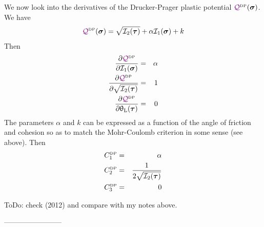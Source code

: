 \vspace{.5cm}

We now look into the derivatives of the Drucker-Prager plastic potential ${\color{violet}\cal Q}^{\text{\tiny DP}}(\bm\sigma)$.
We have
\[
{\color{violet}\cal Q}^{\text{\tiny DP}} (\bm\sigma)= \sqrt{{\cal I}_2({\bm \tau})} + \alpha {\cal I}_1({\bm \sigma}) + k 
\]
Then
\begin{eqnarray}
\frac{\partial {\color{violet}\cal Q}^{\text{\tiny DP}} }{\partial {\cal I}_1(\bm\sigma)} &=& \alpha \\
\frac{\partial {\color{violet}\cal Q}^{\text{\tiny DP}} }{\partial \sqrt{{\cal I}_2(\bm\tau)}}&=& 1  \\
\frac{\partial {\color{violet}\cal Q}^{\text{\tiny DP}} }{\partial \uptheta_{\rm L}(\bm\tau)} &=& 0 
\end{eqnarray}
The parameters $\alpha$ and $k$ can be expressed as a function of the angle of friction 
and cohesion so as to match the Mohr-Coulomb criterion in some sense (see above).
Then
\begin{eqnarray}
C_1^{\text{\tiny DP}} &=& \alpha  \\ 
C_2^{\text{\tiny DP}} &=& \frac{1}{2  \sqrt{{\cal I}_2(\bm\tau)}   }  \\ 
C_3^{\text{\tiny DP}} &=& 0  
\end{eqnarray}

{\color{orange}ToDo: check \textcite{albo12} (2012) and compare with my notes above.}


------------------------







